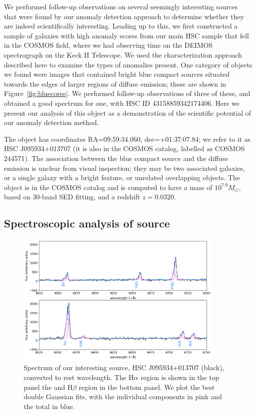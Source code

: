 We performed follow-up observations on several seemingly interesting sources that were found by our anomaly detection approach to determine whether they are indeed scientifically interesting.
Leading up to this, we first constructed a sample of galaxies with high anomaly scores from our main HSC sample that fell in the COSMOS field, where we had observing time on the DEIMOS spectrograph on the Keck II Telescope.
We used the characterization approach described here to examine the types of anomalies present.
One category of objects we found were images that contained bright blue compact sources situated towards the edges of larger regions of diffuse emission; these are shown in Figure~\ref{fig:bluecores}.
We performed follow-up observations of three of these, and obtained a good spectrum for one, with HSC ID 43158859342174406.
Here we present our analysis of this object as a demonstration of the scientific potential of our anomaly detection method.

The object has coordinates RA=09:59:34.060, dec=+01:37:07.84; we refer to it as HSC J095934+013707 (it is also in the COSMOS catalog, labelled as COSMOS 244571).
The association between the blue compact source and the diffuse emission is unclear from visual inspection; they may be two associated galaxies, or a single galaxy with a bright feature, or unrelated overlapping objects.
The object is in the COSMOS catalog and is computed to have a mass of $10^{7.9} M_\odot$, based on 30-band SED fitting, and a redshift $z=0.0320$. 

\subsection{Spectroscopic analysis of source}

\begin{figure}
    \centering
    \includegraphics[width=0.9\textwidth]{spectra}
    \caption{Spectrum of our interesting source, HSC J095934+013707 (black), converted to rest wavelength. The H$\alpha$ region is shown in the top panel the and H$\beta$ region in the bottom panel. We plot the best double Gaussian fits, with the individual components in pink and the total in blue.}
    \label{fig:spectra}
\end{figure}

